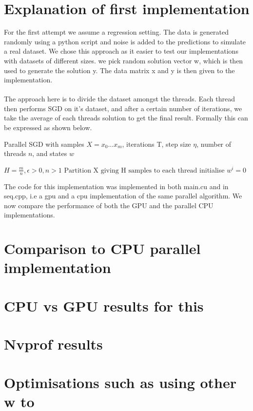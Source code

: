 \documentclass{article}
\begin{document}
\section{Explanation of first implementation}
For the first attempt we assume a regression setting. The data is generated randomly using a python script and noise is added to the predictions to simulate a real dataset. We chose this approach as it easier to test our implementations with datasets of different sizes. we pick random solution vector w, which is then used to generate the solution y. The data matrix x and y is then given to the implementation.
\\\\
The approach here is to divide the dataset amongst the threads. Each thread then performs SGD on it's dataset, and after a certain number of iterations, we take the average of each threads solution to get the final result.
Formally this can be expressed as shown below.
\begin{algorithm}
	\caption{Parallel SGD with samples $X= x_0 ... x_m$, iterations T, step size $\eta$, number of threads $n$, and states $w$ }\label{psgd}
	\begin{algorithmic}[1]
		\Require $H = \frac{m}{n}, \epsilon > 0, n > 1$
		\State $\text{Partition X giving H samples to each thread}$
		\State initialise $w^i = 0$
		\EndFor
		\EndFor
		\EndProcedure
	\end{algorithmic}
\end{algorithm}

The code for this implementation was implemented in both main.cu and in seq.cpp, i.e a gpu and a cpu implementation of the same parallel algorithm. We now compare the performance of both the GPU and the parallel CPU implementations.




\section{Comparison to CPU parallel implementation}

\section{CPU vs GPU results for this}

\section{Nvprof results}

\section{Optimisations such as using other w to}
\end{document}
